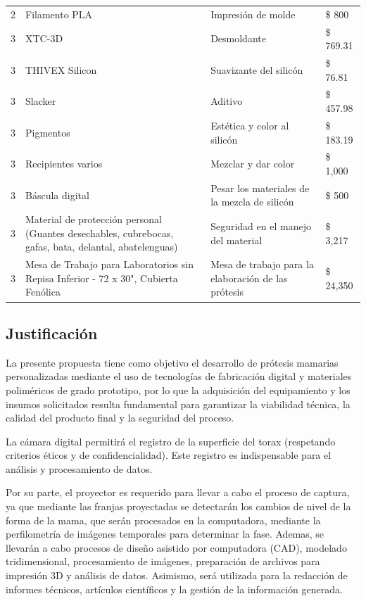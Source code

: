 \documentclass[12pt,a4paper]{article}
\begin{document}
\begin{longtable}{p{0.8cm} p{7cm} p{5cm} p{2cm}}
2 & Filamento PLA & Impresión de molde & \$ 800 \\
3 & XTC-3D & Desmoldante & \$ 769.31 \\
3 & THIVEX Silicon & Suavizante del silicón & \$ 76.81 \\
3 & Slacker & Aditivo & \$ 457.98 \\
3 & Pigmentos & Estética y color al silicón & \$ 183.19 \\
3 & Recipientes varios  & Mezclar y dar color & \$ 1,000 \\
3 & Báscula digital & Pesar los materiales de la mezcla de silicón & \$ 500 \\
3 & Material de protección personal (Guantes desechables, cubrebocas, gafas, bata, delantal, abatelenguas) & Seguridad en el manejo del material & \$ 3,217 \\
3 & Mesa de Trabajo para Laboratorios sin Repisa Inferior - 72 x 30", Cubierta Fenólica & Mesa de trabajo para la elaboración de las prótesis & \$ 24,350 \\

\bottomrule
\end{longtable}

\subsection{Justificación}
La presente propuesta tiene como objetivo el desarrollo de prótesis mamarias personalizadas mediante el uso de tecnologías de 
fabricación digital y materiales poliméricos de grado prototipo, por lo que la adquisición del equipamiento y los insumos solicitados 
resulta fundamental para garantizar la viabilidad técnica, la calidad del producto final y la seguridad del proceso.

La cámara digital permitirá el registro de la superficie del torax (respetando criterios éticos y de confidencialidad). 
Este registro es indispensable para el análisis y procesamiento de datos.

Por su parte, el proyector es requerido para llevar a cabo el proceso de captura, ya que mediante las franjas
proyectadas se detectarán los cambios de nivel de la forma de la mama, que serán procesados 
en la computadora, mediante la perfilometría de imágenes temporales para determinar la fase.
Ademas, se llevarán a cabo procesos de diseño asistido por computadora (CAD), 
modelado tridimensional, procesamiento de imágenes, preparación de archivos para impresión 3D 
y análisis de datos. Asimismo, será utilizada para la redacción de informes técnicos, 
artículos científicos y la gestión de la información generada.
\end{document}

